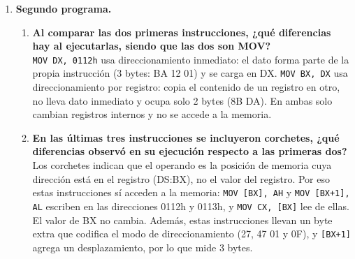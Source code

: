 \documentclass[10pt]{article}
\begin{document}
\begin{enumerate}
\begin{enumerate}
    \item \textbf{¿Cuál es la función que cumple el registro IP dentro del primer programa?}\\
    IP (\textit{Instruction Pointer}) contiene el desplazamiento, dentro del segmento de código CS, de la siguiente instrucción por ejecutar. La pareja CS:IP indica al procesador dónde leer. Comienza en 0100h y se incrementa automáticamente según el tamaño de cada instrucción ejecutada, avanzando por el programa hasta llegar a \texttt{RET}.

    \item \textbf{En la columna OFFSET de la Tabla 1 los valores no se incrementan a una razón constante, ¿por qué?}\\
    Porque las instrucciones no ocupan el mismo número de bytes. Las instrucciones con dato inmediato de 8 bits (por ejemplo \texttt{MOV AH, 7Ah}) miden 2 bytes, las de 16 bits (por ejemplo \texttt{MOV AX, 100}) miden 3 bytes y \texttt{RET} mide 1 byte. Cada offset es el anterior más el tamaño de esa instrucción: 0100, 0102, 0104, 0106, 0109, 010C, 010F y 0112.
  \end{enumerate}

  \item \textbf{Segundo programa.}
  \begin{enumerate}
    \item \textbf{Al comparar las dos primeras instrucciones, ¿qué diferencias hay al ejecutarlas, siendo que las dos son MOV?}\\
    \texttt{MOV DX, 0112h} usa direccionamiento inmediato: el dato forma parte de la propia instrucción (3 bytes: BA 12 01) y se carga en DX. \texttt{MOV BX, DX} usa direccionamiento por registro: copia el contenido de un registro en otro, no lleva dato inmediato y ocupa solo 2 bytes (8B DA). En ambas solo cambian registros internos y no se accede a la memoria.

    \item \textbf{En las últimas tres instrucciones se incluyeron corchetes, ¿qué diferencias observó en su ejecución respecto a las primeras dos?}\\
    Los corchetes indican que el operando es la posición de memoria cuya dirección está en el registro (DS:BX), no el valor del registro. Por eso estas instrucciones sí acceden a la memoria: \texttt{MOV [BX], AH} y \texttt{MOV [BX+1], AL} escriben en las direcciones 0112h y 0113h, y \texttt{MOV CX, [BX]} lee de ellas. El valor de BX no cambia. Además, estas instrucciones llevan un byte extra que codifica el modo de direccionamiento (27, 47 01 y 0F), y \texttt{[BX+1]} agrega un desplazamiento, por lo que mide 3 bytes.


\end{enumerate}
\end{enumerate}
\end{document}
